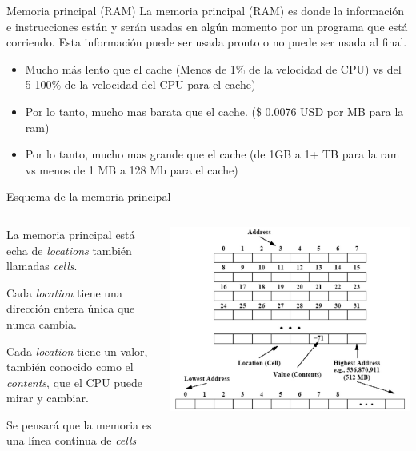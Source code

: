 \documentclass[11pt]{beamer}
\begin{document}
		\begin{frame}{Memoria principal (RAM)}
			La memoria principal (RAM) es donde la información e instrucciones están y serán usadas en algún momento por un programa que está corriendo. Esta información puede ser usada pronto o no puede ser usada al final.
			\begin{itemize}
				\item Mucho más lento que el cache (Menos de 1\% de la velocidad de CPU) vs del 5-100\% de la velocidad del CPU para el cache)
				\item Por lo tanto, mucho mas barata que el cache. (\$ 0.0076 USD por MB para la ram)
				\item Por lo tanto, mucho mas grande que el cache (de 1GB a 1+ TB para la ram vs menos de 1 MB a 128 Mb para el cache)
			\end{itemize}			 
		\end{frame}
		\begin{frame}{Esquema de la memoria principal}
			\begin{columns}
				\begin{column}{0.4\textwidth}
					La memoria principal está echa de \textit{locations} también llamadas \textit{cells}.
					
					Cada \textit{location} tiene una dirección entera única que nunca cambia.
					
					Cada \textit{location} tiene un valor, también conocido como el \textit{contents}, que el CPU puede mirar y cambiar.
					
					Se pensará que la memoria es una línea continua de \textit{cells}
				\end{column}
				\begin{column}{0.6\textwidth}
					\includegraphics[width=\textwidth]{ram.jpg}
				\end{column}				
			\end{columns}
		\end{frame}
\end{document}
